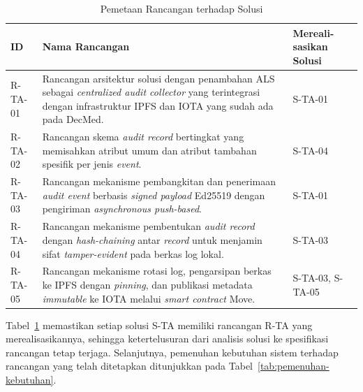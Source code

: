 \begin{table}[htbp]
\centering
\caption{Pemetaan Rancangan terhadap Solusi}
\label{tab:pemetaan-rancangan-solusi}
\renewcommand{\arraystretch}{1.3}
\begin{tabular}{|p{1.5cm}|p{8.5cm}|p{2.5cm}|}
\hline
\textbf{ID} & \textbf{Nama Rancangan} & \textbf{Mereali- sasikan Solusi} \\
\hline
R-TA-01 & Rancangan arsitektur solusi dengan penambahan ALS sebagai \textit{centralized audit collector} yang terintegrasi dengan infrastruktur IPFS dan IOTA yang sudah ada pada DecMed. & S-TA-01 \\
\hline
R-TA-02 & Rancangan skema \textit{audit record} bertingkat yang memisahkan atribut umum dan atribut tambahan spesifik per jenis \textit{event}. & S-TA-04 \\
\hline
R-TA-03 & Rancangan mekanisme pembangkitan dan penerimaan \textit{audit event} berbasis \textit{signed payload} Ed25519 dengan pengiriman \textit{asynchronous push-based}. & S-TA-01 \\
\hline
R-TA-04 & Rancangan mekanisme pembentukan \textit{audit record} dengan \textit{hash-chaining} antar \textit{record} untuk menjamin sifat \textit{tamper-evident} pada berkas log lokal. & S-TA-03 \\
\hline
R-TA-05 & Rancangan mekanisme rotasi log, pengarsipan berkas ke IPFS dengan \textit{pinning}, dan publikasi metadata \textit{immutable} ke IOTA melalui \textit{smart contract} Move. & S-TA-03, S-TA-05 \\
\hline
\end{tabular}
\end{table}

Tabel~\ref{tab:pemetaan-rancangan-solusi} memastikan setiap solusi S-TA memiliki rancangan R-TA yang merealisasikannya, sehingga ketertelusuran dari analisis solusi ke spesifikasi rancangan tetap terjaga. Selanjutnya, pemenuhan kebutuhan sistem terhadap rancangan yang telah ditetapkan ditunjukkan pada Tabel~\ref{tab:pemenuhan-kebutuhan}.

